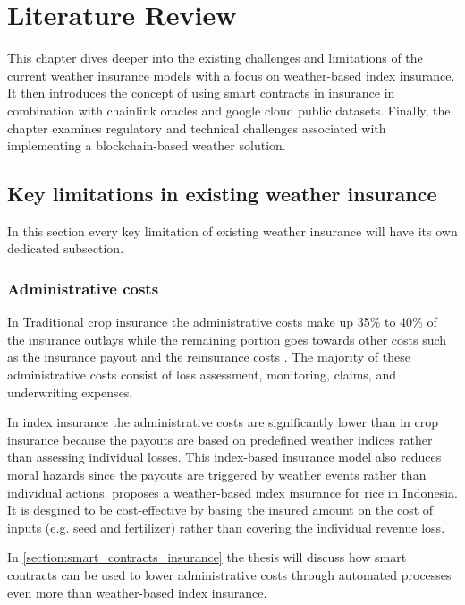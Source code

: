 \chapter{Literature Review}\label{chapter:literature_review}

This chapter dives deeper into the existing challenges and limitations of the current weather insurance models with a focus on weather-based index insurance. It then introduces the concept of using smart contracts in insurance in combination with chainlink oracles and google cloud public datasets. Finally, the chapter examines regulatory and technical challenges associated with implementing a blockchain-based weather solution. 

\section{Key limitations in existing weather insurance}\label{section:key_limitations_existing_insurance}

In this section every key limitation of existing weather insurance will have its own dedicated subsection.

\subsection{Administrative costs}

In Traditional crop insurance the administrative costs make up 35\% to 40\% of the insurance outlays while the remaining portion goes towards other costs such as the insurance payout and the reinsurance costs \autocite{glauber2004crop}. The majority of these administrative costs consist of loss assessment, monitoring, claims, and underwriting expenses.

In index insurance the administrative costs are significantly lower than in crop insurance because the payouts are based on predefined weather indices rather than assessing individual losses. This index-based insurance model also reduces moral hazards since the payouts are triggered by weather events rather than individual actions. \autocite{kusuma2018viable} proposes a weather-based index insurance for rice in Indonesia. It is desgined to be cost-effective by basing the insured amount on the cost of inputs (e.g. seed and fertilizer) rather than covering the individual revenue loss.

In \cref{section:smart_contracts_insurance} the thesis will discuss how smart contracts can be used to lower administrative costs through automated processes even more than weather-based index insurance.

